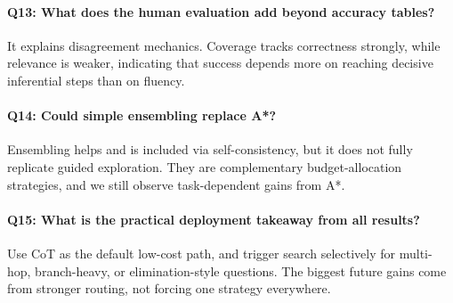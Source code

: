 \documentclass[11pt]{article}
\begin{document}
\paragraph{Q13: What does the human evaluation add beyond accuracy tables?}
It explains disagreement mechanics. Coverage tracks correctness strongly, while relevance is weaker, indicating that success depends more on reaching decisive inferential steps than on fluency.

\paragraph{Q14: Could simple ensembling replace A*?}
Ensembling helps and is included via self-consistency, but it does not fully replicate guided exploration. They are complementary budget-allocation strategies, and we still observe task-dependent gains from A*.

\paragraph{Q15: What is the practical deployment takeaway from all results?}
Use CoT as the default low-cost path, and trigger search selectively for multi-hop, branch-heavy, or elimination-style questions. The biggest future gains come from stronger routing, not forcing one strategy everywhere.
\end{document}
